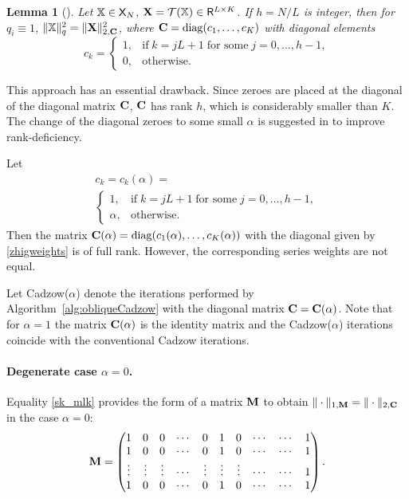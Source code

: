 \documentclass[sii]{ipart}
\newtheorem{lemma}{Lemma}
\begin{document}
\begin{lemma}[\cite{Gillard2014}]
	\label{zhiglemma}
	Let $\mathbb{X} \in \mathsf{X}_N$, $\mathbf{X} = \mathcal{T}(\mathbb{X}) \in \mathsf{R}^{L \times K}$. If $h = N/L$ is integer, then for $q_i\equiv 1$,  $\|\mathbb{X}\|^2_q = \|\mathbf{X}\|^2_{2, \mathbf{C}}$, where $\mathbf{C}=\mathop{\mathrm{diag}}(c_1,\ldots,c_K)$ with diagonal elements 
	\begin{equation*}
	c_k = \begin{cases}
	1, & \text{if} \; k = jL+1 \;\text{for some} \; j = 0, \ldots, h-1, \\
	0, & \text{otherwise}.
	\end{cases}
	\end{equation*}
\end{lemma}

This approach has an essential drawback. Since zeroes are placed at the diagonal of the diagonal matrix $\mathbf{C}$, $\mathbf{C}$ has rank $h$, which is considerably smaller than $K$. The change of the diagonal zeroes to some small $\alpha$ is suggested in \cite{Gillard2014} to improve rank-deficiency.

Let
\begin{multline}\label{zhigweights}
c_k = c_k(\alpha) =\\ \begin{cases}
1, & \text{if} \; k = jL+1 \; \text{for some} \; j = 0, \ldots, h-1, \\
\alpha, & \text{otherwise.}
\end{cases}
\end{multline}
Then the matrix $\mathbf{C}(\alpha)=\mathop{\mathrm{diag}}(c_1(\alpha),\ldots,c_K(\alpha))$ with the diagonal given by \eqref{zhigweights} is of full rank.
However, the corresponding series weights are not equal.

Let Cadzow($\alpha$) denote the iterations performed by Algorithm~\ref{alg:obliqueCadzow} with the diagonal matrix $\mathbf{C}=\mathbf{C}(\alpha)$.
	Note that for $\alpha=1$ the matrix $\mathbf{C}(\alpha)$ is the identity matrix and the Cadzow($\alpha$) iterations coincide with the conventional Cadzow iterations.

\paragraph*{Degenerate case $\alpha=0$.}

Equality \eqref{sk_mlk} provides the form of a matrix $\mathbf{M}$ to obtain $\|\cdot\|_{1, \mathbf{M}} = \|\cdot\|_{2, \mathbf{C}}$ in the case $\alpha = 0$:
\begin{equation}
\label{eq:degenerateM}
\bfM = \begin{pmatrix}
1 & 0 & 0 & \cdots & 0 & 1 & 0 & \cdots & \cdots & 1 \\
1 & 0 & 0 & \cdots & 0 & 1 & 0 & \cdots & \cdots & 1 \\
\vdots & \vdots & \vdots & \cdots & \vdots & \vdots & \vdots & \cdots & \cdots & 1 \\
1 & 0 & 0 & \cdots & 0 & 1 & 0 & \cdots & \cdots & 1
\end{pmatrix}.
\end{equation}
\end{document}

